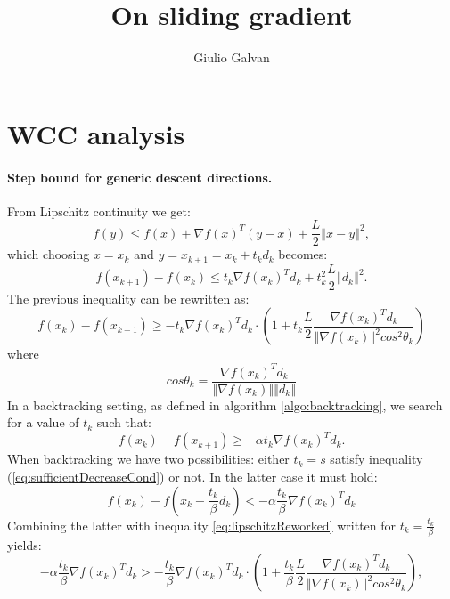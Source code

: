 \documentclass{article}
\title{On sliding gradient}
\author{Giulio Galvan}
\newcommand{\norm}[1]{\left\Vert #1 \right\Vert}
\begin{document}
	\maketitle

\section{WCC analysis}
\paragraph{Step bound for generic descent directions.}	
From Lipschitz continuity we get:
\begin{equation}
	f(y) \leq f(x) + \nabla f(x)^T(y-x) + \frac{L}{2}\norm{x-y}^2,
\end{equation}
which choosing $x=x_k$ and $y=x_{k+1}=x_k + t_k d_k$ becomes:
\begin{equation}
	f(x_{k+1})-f(x_k) \leq t_k\nabla f(x_k)^Td_k+ t_k^2\frac{L}{2}\norm{d_k}^2.
\end{equation}
The previous inequality can be rewritten as:
\begin{equation}
f(x_k)- f(x_{k+1}) \geq - t_k\nabla f(x_k)^Td_k\cdot \left(1+t_k\frac{L}{2}\frac{\nabla f(x_k)^Td_k}{\norm{\nabla f(x_k)}^2 cos^2\theta_k}\right)
\label{eq:lipschitzReworked}
\end{equation}
where
\begin{equation}
cos\theta_k=\frac{\nabla f(x_k)^Td_k}{\norm{\nabla f(x_k)}\norm{d_k}}
\end{equation}
In a backtracking setting, as defined in algorithm \ref{algo:backtracking}, we search for a value of $t_k$ such that:
\begin{equation}
	f(x_k) - f(x_{k+1})\geq -\alpha t_k \nabla f(x_k)^Td_k.
	\label{eq:sufficientDecreaseCond}
\end{equation}
When backtracking we have two possibilities: either $t_k=s$ satisfy inequality (\ref{eq:sufficientDecreaseCond}) or not. In the latter case it must hold:
\begin{equation}
		f(x_k)-f(x_{k}+\frac{t_k}{\beta}d_k) < -\alpha \frac{t_k}{\beta} \nabla f(x_k)^Td_k
\label{eq:sufficientDecreaseViolated}
\end{equation}
Combining the latter with inequality \ref{eq:lipschitzReworked} written for $t_k=\frac{t_k}{\beta}$ yields:
\begin{equation}
-\alpha \frac{t_k}{\beta} \nabla f(x_k)^Td_k > - \frac{t_k}{\beta}\nabla f(x_k)^Td_k\cdot \left(1+\frac{t_k}{\beta}\frac{L}{2}\frac{\nabla f(x_k)^Td_k}{\norm{\nabla f(x_k)}^2 cos^2\theta_k}\right),
\end{equation}
\end{document}
